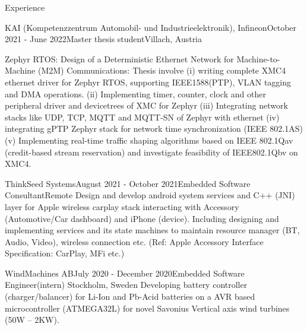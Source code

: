 \documentclass[
	11pt, %
]{resume} %
\begin{document}

\begin{rSection}{Experience}

	\begin{rSubsection}{KAI (Kompetenzzentrum Automobil- und Industrieelektronik), Infineon}{October 2021 - June 2022}{Master thesis student}{Villach, Austria}

            {\color{orange} Zephyr RTOS: Design of a Deterministic Ethernet Network for Machine-to-Machine (M2M) Communications}: Thesis involve (i) writing complete XMC4 ethernet driver for Zephyr RTOS, supporting IEEE1588(PTP), VLAN tagging and DMA operations. (ii) Implementing timer, counter, clock and other peripheral driver and devicetrees of XMC for Zephyr (iii) Integrating network stacks like UDP, TCP, MQTT and MQTT-SN of Zephyr with ethernet (iv) integrating gPTP Zephyr stack for network time synchronization (IEEE 802.1AS) (v) Implementing real-time traffic shaping algorithms based on IEEE 802.1Qav (credit-based stream reservation) and investigate feasibility of IEEE802.1Qbv on XMC4.
		
	\end{rSubsection}


	\begin{rSubsection}{ThinkSeed Systems}{August 2021 - October 2021}{Embedded Software Consultant}{Remote}
            Design and develop android system services and C++ (JNI) layer for Apple wireless carplay stack interacting with Accessory (Automotive/Car dashboard) and iPhone (device). Including designing and implementing services and its state machines to maintain resource manager (BT, Audio, Video), wireless connection etc. (Ref: Apple Accessory Interface Specification: CarPlay, MFi etc.)

		
	\end{rSubsection}


	\begin{rSubsection}{WindMachines AB}{July 2020 - December 2020}{Embedded Software Engineer(intern)}{ Stockholm, Sweden}
            Developing battery controller (charger/balancer) for Li-Ion and Pb-Acid batteries on a AVR based microcontroller (ATMEGA32L) for novel Savonius Vertical axis wind turbines (50W – 2KW).


\end{rSubsection}
\end{rSection}
\end{document}
